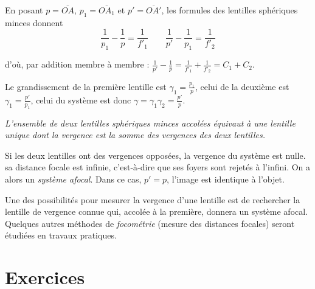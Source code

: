 En posant $p = \overline{OA}$, $p_1 = \overline{OA_1}$ et $p' = \overline{OA'}$, les formules des lentilles sphériques minces donnent
\begin{equation}
  \frac{1}{p_1} - \frac{1}{p} = \frac{1}{f'_1} \qquad \frac{1}{p'} - \frac{1}{p_1} = \frac{1}{f'_2}
\end{equation}

d'où, par addition membre à membre : $\frac{1}{p'} - \frac{1}{p} = \frac{1}{f'_1} + \frac{1}{f'_2} = C_1 + C_2$. 

Le grandissement de la première lentille est $\gamma_1 = \frac{p_1}{p}$, celui de la deuxième est $\gamma_1 = \frac{p'}{p_1}$, celui du système est donc $\gamma = \gamma_1 \gamma_2 = \frac{p'}{p}$.

\emph{L'ensemble de deux lentilles sphériques minces accolées équivaut à une lentille unique dont la vergence est la somme des vergences des deux lentilles.}

Si les deux lentilles ont des vergences opposées, la vergence du système est nulle. sa distance focale est infinie, c'est-à-dire que ses foyers sont rejetés à l'infini. On a alors un \emph{système afocal}. Dans ce cas, $p' = p$, l'image est identique à l'objet.

Une des possibilités pour mesurer la vergence d'une lentille est de rechercher la lentille de vergence connue qui, accolée à la première, donnera un système afocal. Quelques autres méthodes de \emph{focométrie} (mesure des distances focales) seront étudiées en travaux pratiques.

\section{Exercices}
\label{chap8-sec:exercices}

